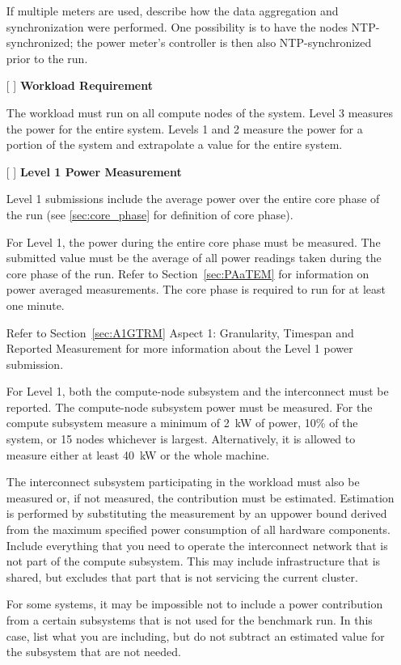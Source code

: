 \begin{itemize}
If multiple meters are used, describe how the data aggregation and synchronization were performed. One possibility is to have the nodes NTP-synchronized; the power meter's controller is then also NTP-synchronized prior to the run.

\item[{[ ]}]
\textbf{Workload Requirement}

The workload must run on all compute nodes of the system. Level 3 measures the power for the entire system. Levels 1 and 2 measure the power for a portion of the system and extrapolate a value for the entire system. 

\item[{[ ]}]
\textbf{Level 1 Power Measurement}

Level 1 submissions include the average power over the entire core phase of the run (see \ref{sec:core_phase} for definition of core phase).

For Level 1, the power during the entire core phase must be measured.
The submitted value must be the average of all power readings taken during the core phase of the run.
Refer to Section~\ref{sec:PAaTEM} for information on power averaged measurements.
The core phase is required to run for at least one minute.

Refer to Section~\ref{sec:A1GTRM} Aspect 1: Granularity, Timespan and Reported Measurement for more information about the Level 1 power submission.

For Level 1, both the compute-node subsystem and the interconnect must be reported.  
The compute-node subsystem power must be measured. 
For the compute subsystem measure a minimum of 2~kW of power, 10\% of the system, or 15 nodes whichever is largest.
Alternatively, it is allowed to measure either at least 40~kW or the whole machine.

The interconnect subsystem participating in the workload must also be measured or, if not measured, the contribution must be estimated.
Estimation is performed by substituting the measurement by an uppower bound derived from the maximum specified power consumption of all hardware components.
Include everything that you need to operate the interconnect network that is not part of the compute subsystem. 
This may include infrastructure that is shared, but excludes that part that is not servicing the current cluster.

For some systems, it may be impossible not to include a power contribution from a certain subsystems that is not used for the benchmark run.
In this case, list what you are including, but do not subtract an estimated value for the subsystem that are not needed.


\end{itemize}
